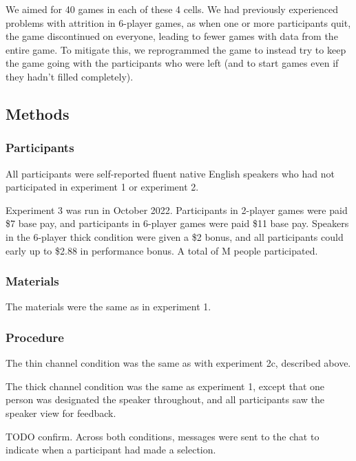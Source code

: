 \documentclass[
  english,
  a4paper,
]{article}
\begin{document}
We aimed for 40 games in each of these 4 cells. We had previously experienced problems with attrition in 6-player games, as when one or more participants quit, the game discontinued on everyone, leading to fewer games with data from the entire game. To mitigate this, we reprogrammed the game to instead try to keep the game going with the participants who were left (and to start games even if they hadn't filled completely).

\hypertarget{methods-2}{%
\subsection{Methods}\label{methods-2}}

\hypertarget{participants-2}{%
\subsubsection{Participants}\label{participants-2}}

All participants were self-reported fluent native English speakers who had not participated in experiment 1 or experiment 2.

Experiment 3 was run in October 2022. Participants in 2-player games were paid \$7 base pay, and participants in 6-player games were paid \$11 base pay. Speakers in the 6-player thick condition were given a \$2 bonus, and all participants could early up to \$2.88 in performance bonus. A total of M people participated.

\hypertarget{materials-2}{%
\subsubsection{Materials}\label{materials-2}}

The materials were the same as in experiment 1.

\hypertarget{procedure-2}{%
\subsubsection{Procedure}\label{procedure-2}}

The thin channel condition was the same as with experiment 2c, described above.

The thick channel condition was the same as experiment 1, except that one person was designated the speaker throughout, and all participants saw the speaker view for feedback.

TODO confirm. Across both conditions, messages were sent to the chat to indicate when a participant had made a selection.
\end{document}
